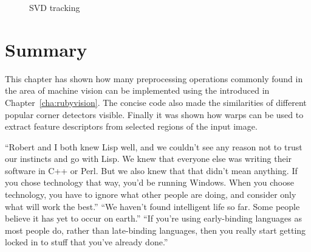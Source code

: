 \documentclass[12pt,a4paper,oneside,openright]{book}
\newcommand{\cha}[1]{Chapter~\ref{cha:#1}}
\newcommand{\removed}[1]{\cbstart\removedfragile{#1}\cbend{}}
\newcommand{\removedfragile}[1]{{\color{red}{\sout{#1}}}{}}
\newcommand{\added}[1]{\cbstart\addedfragile{#1}\cbend{}}
\newcommand{\addedfragile}[1]{{\color{green!50!black}{\uline{#1}}}{}}
\newcommand{\removed}[1]{}
\newcommand{\removedfragile}[1]{}
\newcommand{\added}[1]{#1}
\newcommand{\addedfragile}[1]{#1}
\newcommand{\changed}[2]{\removed{#1}\added{#2}}
\begin{document}
\begin{CJK}{UTF8}{}
\begin{figure}[htbp]
\begin{center}
    \caption{\acs{SVD} tracking\label{fig:svdtrack}}
  \end{center}
\end{figure}

\section{Summary}\label{cha:sumvision}
This chapter has shown how many preprocessing operations commonly found in the area of machine vision can be implemented using the \changed{DSL}{library} introduced in \cha{rubyvision}. The concise code also made the similarities of different popular corner detectors visible. Finally it was shown how warps can be used to extract feature descriptors from selected regions of the input image.

\begin{savequote}[8cm]
  \begin{singlespace}
    ``Robert and I both knew Lisp well, and we couldn't see any reason not to trust our instincts and go with Lisp. We knew that everyone else was writing their software in C++ or Perl. But we also knew that that didn't mean anything. If you chose technology that way, you'd be running Windows. When you choose technology, you have to ignore what other people are doing, and consider only what will work the best.''
    ``We haven't found intelligent life so far. Some people believe it has yet to occur on earth.''
    ``If you're using early-binding languages as most people do, rather than late-binding languages, then you really start getting locked in to stuff that you've already done.''
  \end{singlespace}
\end{savequote}

\end{CJK}
\end{document}
